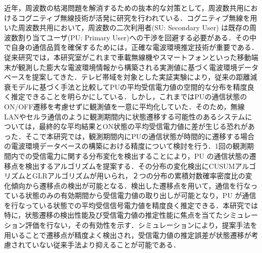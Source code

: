 {}
\begin{jabstract}
近年，周波数の枯渇問題を解消するための抜本的な対策として，周波数共用におけるコグニティブ無線技術が活発に研究を行われている．コグニティブ無線を用いた周波数共用において，周波数の二次利用者(SU: Secondary User) は既存の周波数割り当てユーザ(PU: Primary User)への干渉を回避する必要がある．その中で自身の通信品質を確保するためには，正確な電波環境推定技術が重要である．従来研究では，本研究室がこれまで車載無線機やスマートフォンといった移動端末が観測した膨大な電波環境情報から構築される実測値に基づく電波環境データベースを提案してきた．テレビ帯域を対象とした実証実験により，従来の距離減衰モデルに基づく手法と比較してPUの平均受信電力値の空間的な分布を精度良く推定できることを明らかにしている．しかし，これまではPUの通信状態のON/OFF遷移を考慮せずに観測値を一意に平均化していた．そのため，無線LANやセルラ通信のように観測期間内に状態遷移する可能性のあるシステムについては，最終的な平均結果とON状態の平均受信電力値に差が生じる恐れがあった．そこで本研究では，観測期間内にPUの通信状態が時間的に遷移する場合の電波環境データベースの構築における精度について検討を行う．1回の観測期間内での受信電力に関する分布変化を検出することにより，PU の通信状態の遷移点を検出するアルゴリズムを提案する．その分布の変化検出にCUSUMアルゴリズムとGLRアルゴリズムが用いられ，２つの分布の累積対数確率密度比の変化傾向から遷移点の検出が可能となる．検出した遷移点を用いて，通信を行なっている状態のみの有効期間から受信電力値の取り出しが可能となり，PU が通信を行なっている状態での平均受信信号電力値を精度良く推定できる．本研究では特に，状態遷移の検出性能及び受信電力値の推定性能に焦点を当てたシミュレーション評価を行ない，その有効性を示す．シミュレーションにより，提案手法を用いることで遷移点が精度よく検出され，受信電力値の推定誤差が状態遷移が考慮されていない従来手法より抑えることが可能である．
\end{jabstract}
%
%
%

